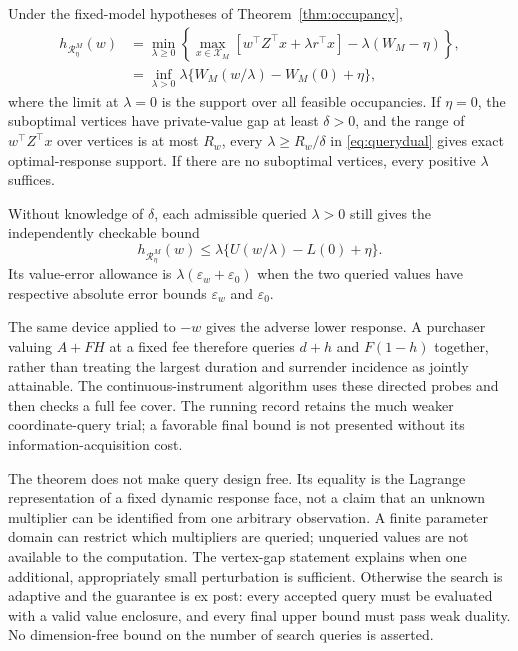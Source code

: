 \begin{theorem}
\label{thm:directed}
Under the fixed-model hypotheses of Theorem~\ref{thm:occupancy},
\begin{align}
 h_{\mathcal R^M_\eta}(w)
 &=\min_{\lambda\geq0}\left\{
     \max_{x\in\mathcal X_M}
       [w^\top Z^\top x+\lambda r^\top x]
       -\lambda(W_M-\eta)\right\},\label{eq:directeddual}\\
 &=\inf_{\lambda>0}\lambda\{W_M(w/\lambda)-W_M(0)+\eta\},
 \label{eq:querydual}
\end{align}
where the limit at $\lambda=0$ is the support over all feasible occupancies. If $\eta=0$, the suboptimal vertices have private-value gap at least $\delta>0$, and the range of $w^\top Z^\top x$ over vertices is at most $R_w$, every $\lambda\geq R_w/\delta$ in \eqref{eq:querydual} gives exact optimal-response support. If there are no suboptimal vertices, every positive $\lambda$ suffices.

Without knowledge of $\delta$, each admissible queried $\lambda>0$ still gives the independently checkable bound
\begin{equation}
 h_{\mathcal R^M_\eta}(w)
 \leq\lambda\{U(w/\lambda)-L(0)+\eta\}.
 \label{eq:directedinterval}
\end{equation}
Its value-error allowance is $\lambda(\varepsilon_w+\varepsilon_0)$ when the two queried values have respective absolute error bounds $\varepsilon_w$ and $\varepsilon_0$.
\end{theorem}

The same device applied to $-w$ gives the adverse lower response. A purchaser valuing $A+FH$ at a fixed fee therefore queries $d+h$ and $F(1-h)$ together, rather than treating the largest duration and surrender incidence as jointly attainable. The continuous-instrument algorithm uses these directed probes and then checks a full fee cover. The running record retains the much weaker coordinate-query trial; a favorable final bound is not presented without its information-acquisition cost.

The theorem does not make query design free. Its equality is the Lagrange representation of a fixed dynamic response face, not a claim that an unknown multiplier can be identified from one arbitrary observation. A finite parameter domain can restrict which multipliers are queried; unqueried values are not available to the computation. The vertex-gap statement explains when one additional, appropriately small perturbation is sufficient. Otherwise the search is adaptive and the guarantee is ex post: every accepted query must be evaluated with a valid value enclosure, and every final upper bound must pass weak duality. No dimension-free bound on the number of search queries is asserted.

